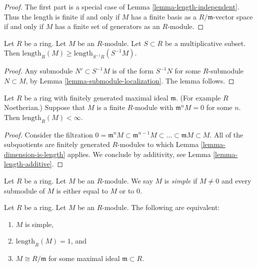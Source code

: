 \begin{proof}
The first part is a special case of Lemma \ref{lemma-length-independent}.
Thus the length is finite if and only if $M$ has a finite basis
as a $R/\mathfrak m$-vector space if and only if $M$ has a finite
set of generators as an $R$-module.
\end{proof}

\begin{lemma}
\label{lemma-length-localize}
Let $R$ be a ring. Let $M$ be an $R$-module. Let $S \subset R$ be
a multiplicative subset. Then
$\text{length}_R(M) \geq \text{length}_{S^{-1}R}(S^{-1}M)$.
\end{lemma}

\begin{proof}
Any submodule $N' \subset S^{-1}M$ is of the form
$S^{-1}N$ for some $R$-submodule $N \subset M$, by Lemma
\ref{lemma-submodule-localization}. The lemma follows.
\end{proof}

\begin{lemma}
\label{lemma-length-finite}
Let $R$ be a ring with finitely generated
maximal ideal $\mathfrak m$. (For example $R$ Noetherian.)
Suppose that $M$ is a finite $R$-module with
$\mathfrak m^n M  =  0$ for some $n$. 
Then $\text{length}_R(M) < \infty$.
\end{lemma}

\begin{proof}
Consider the filtration
$0 = \mathfrak m^n M \subset
\mathfrak m^{n-1} M \subset
\ldots \subset \mathfrak m M \subset M$.
All of the subquotients are finitely generated $R$-modules
to which Lemma \ref{lemma-dimension-is-length} applies. We conclude
by additivity, see Lemma \ref{lemma-length-additive}.
\end{proof}

\begin{definition}
\label{definition-simple-module}
Let $R$ be a ring. Let $M$ be an $R$-module.
We say $M$ is {\it simple} if $M \not = 0$ and
every submodule of $M$ is either equal to $M$ or
to $0$.
\end{definition}

\begin{lemma}
\label{lemma-characterize-length-1}
Let $R$ be a ring. Let $M$ be an $R$-module.
The following are equivalent:
\begin{enumerate}
\item $M$ is simple,
\item $\text{length}_R(M) = 1$, and
\item $M \cong R/\mathfrak m$ for some maximal ideal
$\mathfrak m \subset R$.
\end{enumerate}
\end{lemma}

